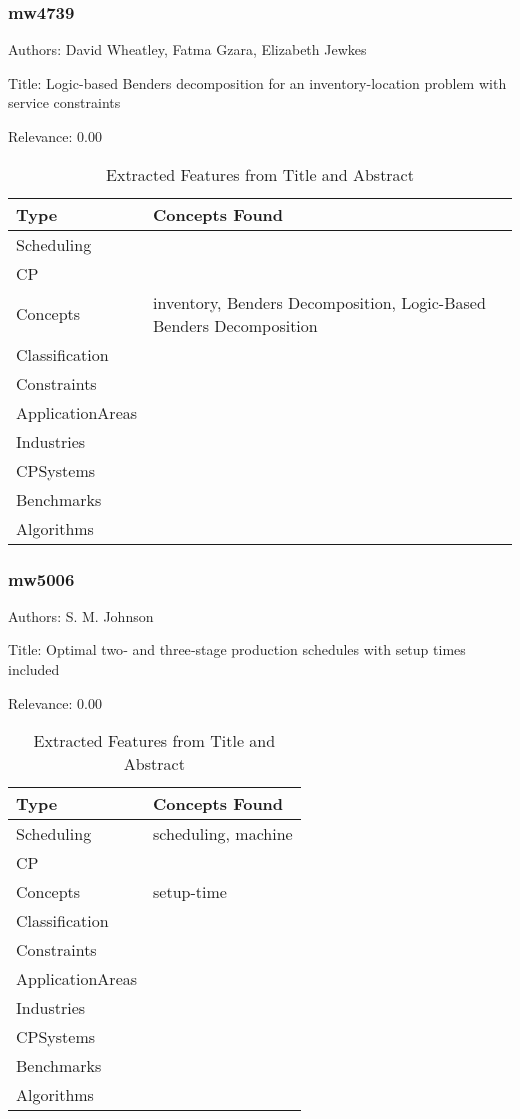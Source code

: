 \subsubsection{mw4739}
\label{mw:mw4739}

Authors: David Wheatley, Fatma Gzara, Elizabeth Jewkes

Title: Logic-based Benders decomposition for an inventory-location problem with service constraints

Relevance:  0.00

{\scriptsize
\begin{longtable}{p{2cm}p{20cm}}
\caption{Extracted Features from Title and Abstract}\\ \toprule
Type & Concepts Found\\ \midrule
\endhead
\bottomrule
\endfoot
Scheduling & \\ 
CP & \\ 
Concepts & inventory, Benders Decomposition, Logic-Based Benders Decomposition\\ 
Classification & \\ 
Constraints & \\ 
ApplicationAreas & \\ 
Industries & \\ 
CPSystems & \\ 
Benchmarks & \\ 
Algorithms & \\ 
\end{longtable}
}



\subsubsection{mw5006}
\label{mw:mw5006}

Authors: S. M. Johnson

Title: Optimal two‐ and three‐stage production schedules with setup times included

Relevance:  0.00

{\scriptsize
\begin{longtable}{p{2cm}p{20cm}}
\caption{Extracted Features from Title and Abstract}\\ \toprule
Type & Concepts Found\\ \midrule
\endhead
\bottomrule
\endfoot
Scheduling & scheduling, machine\\ 
CP & \\ 
Concepts & setup-time\\ 
Classification & \\ 
Constraints & \\ 
ApplicationAreas & \\ 
Industries & \\ 
CPSystems & \\ 
Benchmarks & \\ 
Algorithms & \\ 
\end{longtable}
}


